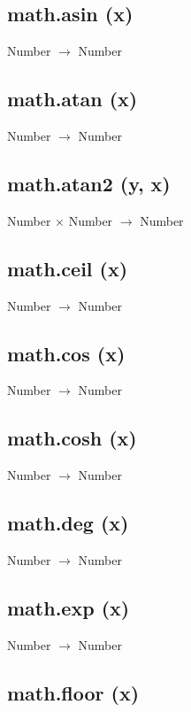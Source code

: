 \documentclass[12pt]{article}
\begin{document}
\subsection{math.asin (x)}

Number $\rightarrow$ Number

\subsection{math.atan (x)}

Number $\rightarrow$ Number

\subsection{math.atan2 (y, x)}

Number $\times$ Number $\rightarrow$ Number

\subsection{math.ceil (x)}

Number $\rightarrow$ Number

\subsection{math.cos (x)}

Number $\rightarrow$ Number

\subsection{math.cosh (x)}

Number $\rightarrow$ Number

\subsection{math.deg (x)}

Number $\rightarrow$ Number

\subsection{math.exp (x)}

Number $\rightarrow$ Number

\subsection{math.floor (x)}
\end{document}
